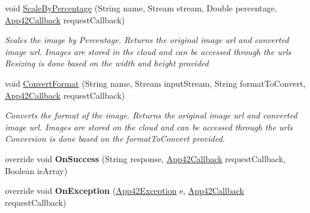 \begin{DoxyCompactItemize}
void \hyperlink{classcom_1_1shephertz_1_1app42_1_1paas_1_1sdk_1_1windows_1_1image_processor_1_1_image_processor_service_a433f3afc47020b6380a525bf7d4caaaf}{Scale\+By\+Percentage} (String name, Stream stream, Double percentage, \hyperlink{interfacecom_1_1shephertz_1_1app42_1_1paas_1_1sdk_1_1windows_1_1_app42_callback}{App42\+Callback} request\+Callback)
\begin{DoxyCompactList}\small\item\em Scales the image by Percentage. Returns the original image url and converted image url. Images are stored in the cloud and can be accessed through the urls Resizing is done based on the width and height provided \end{DoxyCompactList}\item 
void \hyperlink{classcom_1_1shephertz_1_1app42_1_1paas_1_1sdk_1_1windows_1_1image_processor_1_1_image_processor_service_af6842713994ce8aa87249fd08bc37ede}{Convert\+Format} (String name, Stream input\+Stream, String format\+To\+Convert, \hyperlink{interfacecom_1_1shephertz_1_1app42_1_1paas_1_1sdk_1_1windows_1_1_app42_callback}{App42\+Callback} request\+Callback)
\begin{DoxyCompactList}\small\item\em Converts the format of the image. Returns the original image url and converted image url. Images are stored on the cloud and can be accessed through the urls Conversion is done based on the format\+To\+Convert provided. \end{DoxyCompactList}\item 
\hypertarget{classcom_1_1shephertz_1_1app42_1_1paas_1_1sdk_1_1windows_1_1image_processor_1_1_image_processor_service_aa7e756293a109998160bfee60ed1a457}{override void {\bfseries On\+Success} (String response, \hyperlink{interfacecom_1_1shephertz_1_1app42_1_1paas_1_1sdk_1_1windows_1_1_app42_callback}{App42\+Callback} request\+Callback, Boolean is\+Array)}\label{classcom_1_1shephertz_1_1app42_1_1paas_1_1sdk_1_1windows_1_1image_processor_1_1_image_processor_service_aa7e756293a109998160bfee60ed1a457}

\item 
\hypertarget{classcom_1_1shephertz_1_1app42_1_1paas_1_1sdk_1_1windows_1_1image_processor_1_1_image_processor_service_aab5183d8a7e6987ff3cf0ea939f1314f}{override void {\bfseries On\+Exception} (\hyperlink{classcom_1_1shephertz_1_1app42_1_1paas_1_1sdk_1_1windows_1_1_app42_exception}{App42\+Exception} e, \hyperlink{interfacecom_1_1shephertz_1_1app42_1_1paas_1_1sdk_1_1windows_1_1_app42_callback}{App42\+Callback} request\+Callback)}\label{classcom_1_1shephertz_1_1app42_1_1paas_1_1sdk_1_1windows_1_1image_processor_1_1_image_processor_service_aab5183d8a7e6987ff3cf0ea939f1314f}

\end{DoxyCompactItemize}

